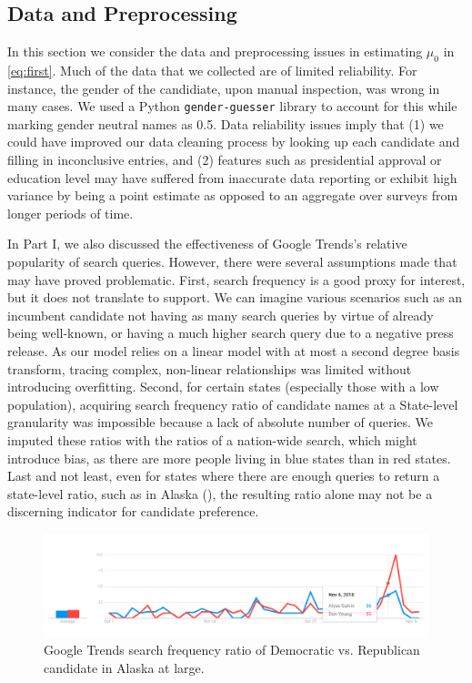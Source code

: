 \documentclass[12pt]{article}
\begin{document}
\subsection{Data and Preprocessing}
In this section we consider the data and preprocessing issues in estimating $\mu_0$ in \eqref{eq:first}. Much of the data that we collected are of limited reliability. For instance, the gender of the candidiate, upon manual inspection, was wrong in many cases. We used a Python \texttt{gender-guesser} library to account for this while marking gender neutral names as 0.5. Data reliability issues imply that (1) we could have improved our data cleaning process by looking up each candidate and filling in inconclusive entries, and (2) features such as presidential approval or education level may have suffered from inaccurate data reporting or exhibit high variance by being a point estimate as opposed to an aggregate over surveys from longer periods of time. 

In Part I, we also discussed the effectiveness of Google Trends's relative
popularity of search queries. However, there were several assumptions made that
may have proved problematic. First, search frequency is a good proxy
for interest, but it does not translate to support. We can imagine various
scenarios such as an incumbent candidate not having as many search queries by
virtue of already being well-known, or having a much higher search query due to
a negative press release. As our model relies on a linear model with at most a
second degree basis transform, tracing complex, non-linear relationships was
limited without introducing overfitting. Second, for certain
states (especially those with a low population), acquiring search frequency
ratio of candidate names at a State-level granularity was impossible because a
lack of absolute number of queries. We imputed these ratios with the ratios of a
nation-wide search, which might introduce bias, as there are more people living in blue states than in red states. Last and not least, even for states
where there are enough queries to return a state-level ratio, such as in Alaska
(), the resulting ratio alone may not be a discerning
indicator for candidate preference.

\begin{figure}[tb]
  \centering
  \includegraphics[scale=0.4]{alaska_candidate}
  \caption{Google Trends search frequency ratio of Democratic vs. Republican candidate in Alaska at large.}
  \label{fig:candidate_only}
\end{figure}
\end{document}
